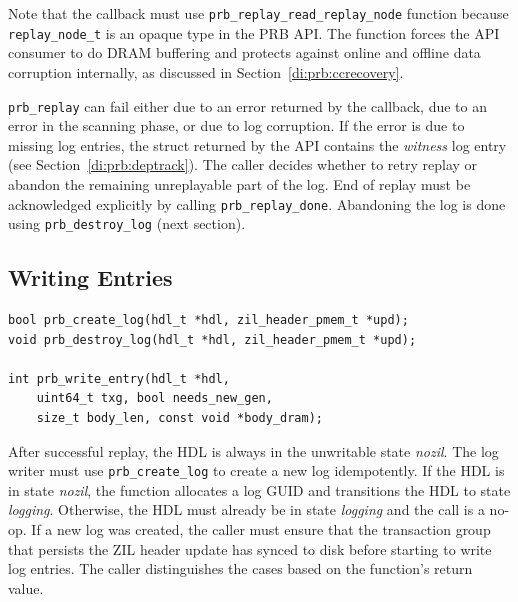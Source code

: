 \documentclass[12pt,a4paper,twoside]{book}
\begin{document}
Note that the callback must use \lstinline{prb_replay_read_replay_node} function because \lstinline{replay_node_t} is an opaque type in the PRB API.
The function forces the API consumer to do DRAM buffering and protects against online and offline data corruption internally, as discussed in Section~\ref{di:prb:ccrecovery}.

\lstinline{prb_replay} can fail either due to an error returned by the callback, due to an error in the scanning phase, or due to log corruption.
If the error is due to missing log entries, the struct returned by the API contains the \textit{witness} log entry (see Section~\ref{di:prb:deptrack}).
The caller decides whether to retry replay or abandon the remaining unreplayable part of the log.
End of replay must be acknowledged explicitly by calling \lstinline{prb_replay_done}.
Abandoning the log is done using \lstinline{prb_destroy_log} (next section).


\subsection{Writing Entries}\label{di:prb:api:write}

\begin{lstlisting}
bool prb_create_log(hdl_t *hdl, zil_header_pmem_t *upd);
void prb_destroy_log(hdl_t *hdl, zil_header_pmem_t *upd);

int prb_write_entry(hdl_t *hdl,
    uint64_t txg, bool needs_new_gen,
    size_t body_len, const void *body_dram);
\end{lstlisting}

After successful replay, the HDL is always in the unwritable state \textit{nozil}.
The log writer must use \lstinline{prb_create_log} to create a new log idempotently.
If the HDL is in state \textit{nozil}, the function allocates a log GUID and transitions the HDL to state \textit{logging}.
Otherwise, the HDL must already be in state \textit{logging} and the call is a no-op.
If a new log was created, the caller must ensure that the transaction group that persists the ZIL header update has synced to disk before starting to write log entries.
The caller distinguishes the cases based on the function's return value.
\end{document}
